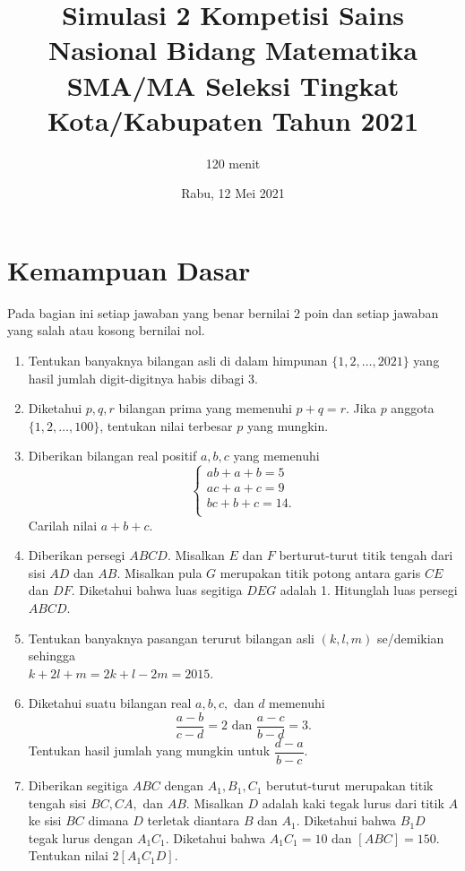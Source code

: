 \documentclass[12pt]{scrartcl}
\title{Simulasi 2 Kompetisi Sains Nasional Bidang Matematika SMA/MA Seleksi Tingkat Kota/Kabupaten Tahun 2021}
\author{120 menit}
\date{Rabu, 12 Mei 2021}
\begin{document}
	\maketitle

\renewcommand*\contentsname{Daftar Isi}
\tableofcontents

\newpage
	
	\section{Kemampuan Dasar}
	Pada bagian ini setiap jawaban yang benar bernilai 2 poin dan setiap jawaban yang salah
	atau kosong bernilai nol.
	\begin{enumerate}
		\item Tentukan banyaknya bilangan asli di dalam himpunan $\{1,2,\dots,2021\}$ yang hasil jumlah digit-digitnya habis dibagi 3.
		
		\item Diketahui $p,q,r$ bilangan prima yang memenuhi $p+q=r$. Jika $p$ anggota $\{1,2,\dots,100\}$, tentukan nilai terbesar $p$ yang mungkin.
		
		\item Diberikan bilangan real positif $a,b,c$ yang memenuhi \begin{equation*}
			\begin{cases}
				ab+a+b=5 \\
				ac+a+c=9 \\
				bc+b+c=14. \\
			\end{cases}
		\end{equation*}
		Carilah nilai $a+b+c$.
		
		\item Diberikan persegi $ABCD$. Misalkan $E$ dan $F$ berturut-turut titik tengah dari sisi $AD$ dan $AB$. Misalkan pula $G$ merupakan titik potong antara garis $CE$ dan $DF$. Diketahui bahwa luas segitiga $DEG$ adalah 1. Hitunglah luas persegi $ABCD$.
		
		\item Tentukan banyaknya pasangan terurut bilangan asli $(k,l,m)$ se/demikian sehingga \\ $k+2l+m=2k+l-2m=2015$.
		
		\item Diketahui suatu bilangan real $a,b,c,$ dan $d$ memenuhi $$\frac{a-b}{c-d}=2 \text{ dan } \frac{a-c}{b-d}=3.$$ Tentukan hasil jumlah yang mungkin untuk $\dfrac{d-a}{b-c}$.
		
		\item Diberikan segitiga $ABC$ dengan $A_1,B_1,C_1$ berutut-turut merupakan titik tengah sisi $BC,CA,$ dan $AB$. Misalkan $D$ adalah kaki tegak lurus dari titik $A$ ke sisi $BC$ dimana $D$ terletak diantara $B$ dan $A_1$. Diketahui bahwa $B_1D$ tegak lurus dengan $A_1C_1$. Diketahui bahwa $A_1C_1 = 10$ dan $[ABC] = 150$. Tentukan nilai $2[A_1C_1D]$.
		

\end{enumerate}
\end{document}
